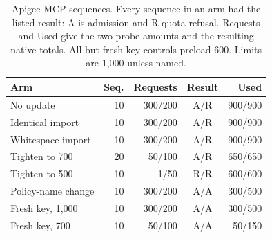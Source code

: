 \begin{table}[t]
\centering\small
\caption{Apigee MCP sequences. Every sequence in an arm had the listed result: A is admission and R quota refusal. Requests and Used give the two probe amounts and the resulting native totals. All but fresh-key controls preload 600. Limits are 1,000 unless named.}
\label{tab:apigee}
\setlength{\tabcolsep}{4pt}
\begin{tabular}{@{}lrrcr@{}}
\toprule
Arm & Seq. & Requests & Result & Used \\
\midrule
No update & 10 & 300/200 & A/R & 900/900 \\
Identical import & 10 & 300/200 & A/R & 900/900 \\
Whitespace import & 10 & 300/200 & A/R & 900/900 \\
Tighten to 700 & 20 & 50/100 & A/R & 650/650 \\
Tighten to 500 & 10 & 1/50 & R/R & 600/600 \\
Policy-name change & 10 & 300/200 & A/A & 300/500 \\
Fresh key, 1,000 & 10 & 300/200 & A/A & 300/500 \\
Fresh key, 700 & 10 & 50/100 & A/A & 50/150 \\
\bottomrule
\end{tabular}
\end{table}
